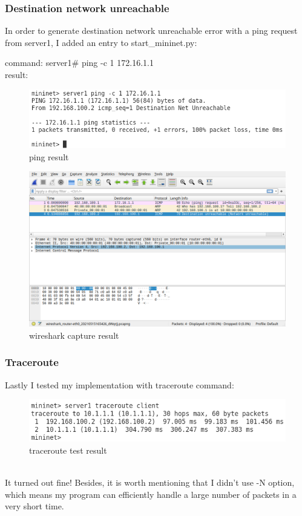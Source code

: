 \documentclass[12pt,a4paper,UTF8]{article}
\begin{document}
\subsubsection{Destination network unreachable}
In order to generate destination network unreachable error with a ping request from server1, I added an entry to start\_mininet.py:

command: server1\# ping -c 1 172.16.1.1 \\
result:
\begin{figure}[htbp]
	\centering
	\includegraphics[width=\textwidth]{7}
	\caption{ping result}
\end{figure}
\begin{figure}[htbp]
	\centering
	\includegraphics[width=\textwidth]{8}
	\caption{wireshark capture result}
\end{figure}

\newpage
\subsubsection{Traceroute}
Lastly I tested my implementation with traceroute command:
\begin{figure}[htbp]
\centering
\includegraphics[width=\textwidth]{9}
\caption{traceroute test result}
\end{figure}
\\It turned out fine! Besides, it is worth mentioning that I didn't use -N option, which means my program can efficiently handle a large number of packets in a very short time.
\end{document}
